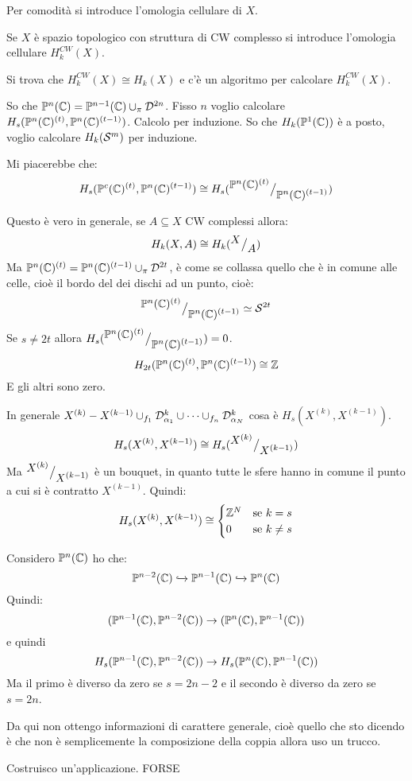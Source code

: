 Per comodità si introduce l'omologia cellulare di $ X $.

Se $ X $ è spazio topologico con struttura di CW complesso si introduce
l'omologia cellulare $ H_k^{CW}(X) $.

Si trova che $ H_k^{CW}(X) \cong H_k(X) $ e c'è un algoritmo per calcolare $ H_k^{CW}(X) $.

So che $ \mathbb{P}^{n} (\mathbb{C}) = \mathbb{P}^{n-1} (\mathbb{C}) \cup_\pi \mathcal{D}^{2n} $. Fisso $ n $ voglio calcolare
$ H_s(\mathbb{P}^{n} (\mathbb{C})^{(t)}, \mathbb{P}^{n} (\mathbb{C})^{(t-1)}) $.
Calcolo per induzione.
So che $ H_k(\mathbb{P}^{1} (\mathbb{C})) $ è a posto, voglio calcolare $ H_k(\mathcal{S}^{m}) $ per induzione.

Mi piacerebbe che:
\[
  H_s(\mathbb{P}^{c} (\mathbb{C})^{(t)}, \mathbb{P}^{n} (\mathbb{C})^{(t-1)}) \cong H_s({^{\textstyle \mathbb{P}^{n} (\mathbb{C})^{(t)}}\big/_{\textstyle \mathbb{P}^{n} (\mathbb{C})^{(t-1)}}})
\]

Questo è vero in generale, se $ A \subseteq X $ CW complessi allora:
\[
  H_k(X,A) \cong H_k({^{\textstyle X}\big/_{\textstyle A}})
\]
Ma $ \mathbb{P}^{n} (\mathbb{C})^{(t)} = \mathbb{P}^{n} (\mathbb{C})^{(t-1)} \cup_\pi \mathcal{D}^{2t} $, è come se collassa
quello che è in comune alle celle, cioè il bordo del dei dischi ad un punto,
cioè:
\[
  {^{\textstyle \mathbb{P}^{n} (\mathbb{C})^{(t)}}\big/_{\textstyle \mathbb{P}^{n} (\mathbb{C})^{(t-1)}}} \simeq \mathcal{S}^{2t}
\]
Se $ s \not = 2 t $ allora $ H_s({^{\textstyle \mathbb{P}^{n} (\mathbb{C})^{(t)}}\big/_{\textstyle \mathbb{P}^{n} (\mathbb{C})^{(t-1)}}}) = 0 $.
\[
  H_{2t}(\mathbb{P}^{n} (\mathbb{C})^{(t)}, \mathbb{P}^{n} (\mathbb{C})^{(t-1)}) \cong \mathbb{Z}
\]
E gli altri sono zero.

In generale $ X^{(k)}- X^{(k-1)} \cup_{f_1} \mathcal{D}^{k}_{\alpha_1} \cup \dots \cup_{f_n} \mathcal{D}^{k}_{\alpha_N} $
cosa è $ H_s(X^{(k)}, X^{(k-1)}) $.
\[
  H_s(X^{(k)}, X^{(k-1)}) \cong H_s({^{\textstyle X^{(k)}}\big/_{\textstyle X^{(k-1)}}})
\]
Ma $ {^{\textstyle X^{(k)}}\big/_{\textstyle X^{(k-1)}}} $ è un bouquet, in quanto tutte le sfere hanno in comune
il punto a cui si è contratto $ X^{(k-1)} $.
Quindi:
\[
  H_s(X^{(k)}, X^{(k-1)}) \cong
  \begin{cases}
    \mathbb{Z}^N & \text{se } k = s \\
    0 & \text{se } k \not = s
  \end{cases}
\]

Considero $ \mathbb{P}^{n} (\mathbb{C}) $ ho che:
\[
  \mathbb{P}^{n-2} (\mathbb{C}) \xhookrightarrow{} \mathbb{P}^{n-1} (\mathbb{C}) \xhookrightarrow{} \mathbb{P}^{n} (\mathbb{C})
\]
Quindi:
\[
  (\mathbb{P}^{n-1} (\mathbb{C}), \mathbb{P}^{n-2} (\mathbb{C})) \to (\mathbb{P}^{n} (\mathbb{C}), \mathbb{P}^{n-1} (\mathbb{C}))
\]
e quindi
\[
  H_s(\mathbb{P}^{n-1} (\mathbb{C}), \mathbb{P}^{n-2} (\mathbb{C})) \to H_s(\mathbb{P}^{n} (\mathbb{C}), \mathbb{P}^{n-1} (\mathbb{C}))
\]
Ma il primo è diverso da zero se $ s = 2n - 2 $ e
il secondo è diverso da zero se $ s = 2n $.

Da qui non ottengo informazioni di carattere generale,
cioè quello che sto dicendo è che non è semplicemente
la composizione della coppia allora uso un trucco.

Costruisco un'applicazione. FORSE

